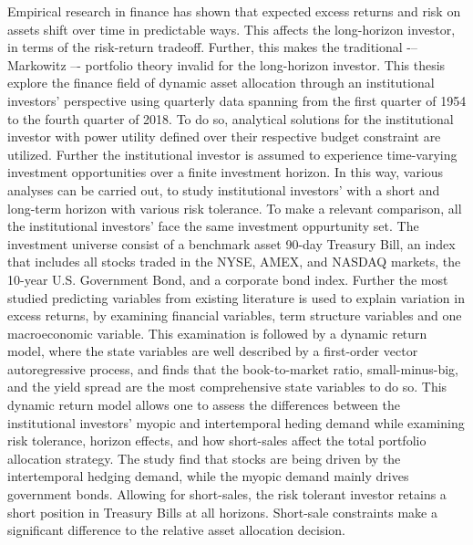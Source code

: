 \documentclass[
  a4paper,
  oneside]{memoir}
\begin{document}
\begin{titlingpage}
\begin{center}
\begin{minipage}{16cm}
Empirical research in finance has shown that expected excess returns and risk
on assets shift over time in predictable ways. This affects the long-horizon investor, in terms of the risk-return tradeoff. Further, this makes the traditional -– Markowitz –- portfolio theory invalid for the long-horizon investor. This thesis explore the finance field of dynamic asset allocation through an institutional investors' perspective using quarterly data spanning from the first quarter of 1954 to the fourth quarter of 2018. To do so, analytical solutions for the institutional investor with power utility defined over their respective budget constraint are utilized. Further the institutional investor is assumed to experience time-varying investment opportunities over a finite investment horizon. In this way, various analyses can be carried out, to study institutional investors' with a short and long-term horizon with various risk tolerance. To make a relevant comparison, all the institutional investors' face the same investment oppurtunity set. The investment universe consist of a benchmark asset 90-day Treasury Bill, an index that includes all stocks traded in the NYSE, AMEX, and NASDAQ markets, the 10-year U.S. Government Bond, and a corporate bond index. Further the most studied predicting variables from existing literature is used to explain variation in excess returns, by examining financial variables, term structure variables and one macroeconomic variable. This examination is followed by a dynamic return model, where the state variables are well described by a first-order vector autoregressive process, and finds that the book-to-market ratio, small-minus-big, and the yield spread are the most comprehensive state variables to do so. This dynamic return model allows one to assess the differences between the institutional investors' myopic and intertemporal heding demand while examining risk tolerance, horizon effects, and how short-sales affect the total portfolio allocation strategy. The study find that stocks are being driven by the intertemporal hedging demand, while the myopic demand mainly drives government bonds. Allowing for short-sales, the risk tolerant investor retains a short position in Treasury Bills at all horizons. Short-sale constraints make a significant difference to the relative asset allocation decision.
\end{minipage}
\end{center}
\end{titlingpage}
\end{document}
